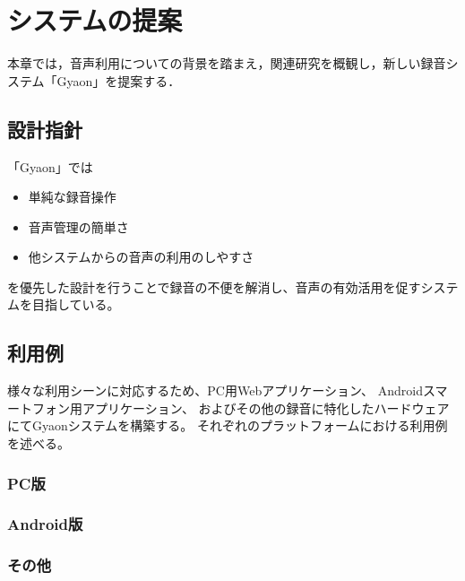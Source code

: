 \chapter{システムの提案}
\label{chap:proposal}

本章では，音声利用についての背景を踏まえ，関連研究を概観し，新しい録音システム「Gyaon」を提案する．

\newpage

\section{設計指針}

「Gyaon」では
\begin{itemize}
\item 単純な録音操作
\item 音声管理の簡単さ
\item 他システムからの音声の利用のしやすさ
\end{itemize}
を優先した設計を行うことで録音の不便を解消し、音声の有効活用を促すシステムを目指している。

\section{利用例}
様々な利用シーンに対応するため、PC用Webアプリケーション、
Androidスマートフォン用アプリケーション、
およびその他の録音に特化したハードウェア
にてGyaonシステムを構築する。
それぞれのプラットフォームにおける利用例を述べる。

\subsection{PC版}

%
%
%
%
%
%


\subsection{Android版}
\subsection{その他}
